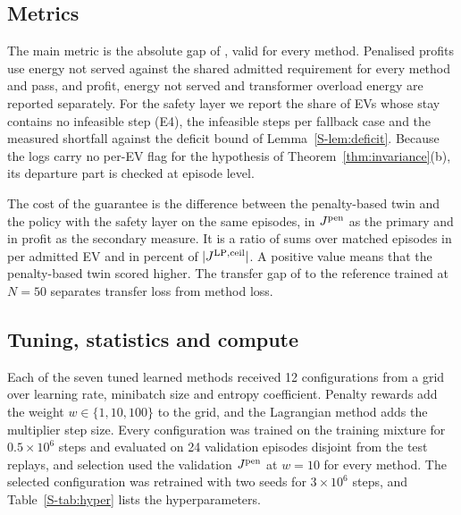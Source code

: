 \subsection{Metrics}\label{sec:metrics}

The main metric is the absolute gap of , valid for every method.
Penalised profits use energy not served against the shared admitted requirement for every method and pass, and profit, energy not served and transformer overload energy are reported separately.
For the safety layer we report the share of EVs whose stay contains no infeasible step (E4), the infeasible steps per fallback case and the measured shortfall against the deficit bound of Lemma~\ref{S-lem:deficit}.
Because the logs carry no per-EV flag for the hypothesis of Theorem~\ref{thm:invariance}(b), its departure part is checked at episode level.

The cost of the guarantee is the difference between the penalty-based twin and the policy with the safety layer on the same episodes, in $J^{\mathrm{pen}}$ as the primary and in profit as the secondary measure.
It is a ratio of sums over matched episodes in \texteuro{} per admitted EV and in percent of $|J^{\mathrm{LP,ceil}}|$.
A positive value means that the penalty-based twin scored higher.
The transfer gap of \method{} to the reference trained at $N=50$ separates transfer loss from method loss.

\subsection{Tuning, statistics and compute}\label{sec:hyper}

Each of the seven tuned learned methods received 12 configurations from a grid over learning rate, minibatch size and entropy coefficient.
Penalty rewards add the weight $w\in\{1,10,100\}$ to the grid, and the Lagrangian method adds the multiplier step size.
Every configuration was trained on the training mixture for $0.5\times10^{6}$ steps and evaluated on 24 validation episodes disjoint from the test replays, and selection used the validation $J^{\mathrm{pen}}$ at $w=10$ for every method.
The selected configuration was retrained with two seeds for $3\times10^{6}$ steps, and Table~\ref{S-tab:hyper} lists the hyperparameters.

